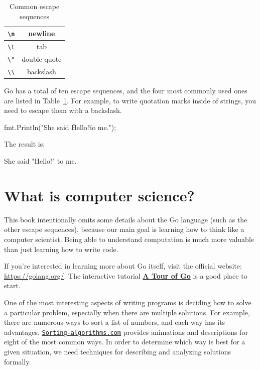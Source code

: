 \begin{table}[!ht]
\begin{center}
\begin{tabular}{|c|c|}
\hline
\verb"\n" & newline \\
\hline
\verb"\t" & tab \\
\hline
\verb'\"' & double quote \\
\hline
\verb"\\" & backslash \\
\hline
\end{tabular}
\caption{Common escape sequences}
\label{tab:escape}
\end{center}
\end{table}

Go has a total of ten escape sequences, and the four most commonly used ones are listed in Table~\ref{tab:escape}.
For example, to write quotation marks inside of strings, you need to escape them with a backslash.

\begin{code}
fmt.Println("She said \"Hello!\" to me.");
\end{code}

The result is:

\begin{stdout}
She said "Hello!" to me.
\end{stdout}


\section{What is computer science?}

This book intentionally omits some details about the Go language (such as the other escape sequences),
because our main goal is learning how to think like a computer scientist.
Being able to understand computation is much more valuable than just learning how to write code.

If you're interested in learning more about Go itself, visit the official website: \url{https://golang.org/}.
The interactive tutorial \href{https://tour.golang.org/welcome/1}{\bf A Tour of Go} is a good place to start.

One of the most interesting aspects of writing programs is deciding how to solve a particular problem, especially when there are multiple solutions.
For example, there are numerous ways to sort a list of numbers, and each way has its advantages.
\href{https://www.toptal.com/developers/sorting-algorithms/}{\tt Sorting-algorithms.com} provides animations and descriptions for eight of the most common ways.
In order to determine which way is best for a given situation, we need techniques for describing and analyzing solutions formally.

